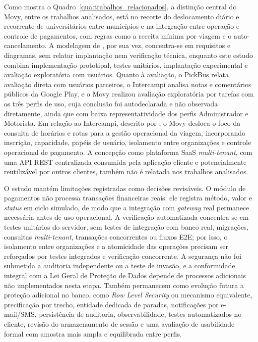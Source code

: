 \documentclass[a4paper,12pt]{article}
\begin{document}
Como mostra o Quadro~\ref{qua:trabalhos_relacionados}, a distinção central do Movy, entre os trabalhos analisados, está no recorte do deslocamento diário e recorrente de universitários entre municípios e na integração entre operação e controle de pagamentos, com regras como a receita mínima por viagem e o auto-cancelamento. A modelagem de , por sua vez, concentra-se em requisitos e diagramas, sem relatar implantação nem verificação técnica, enquanto este estudo combina implementação prototipal, testes unitários, implantação experimental e avaliação exploratória com usuários. Quanto à avaliação, o PickBus relata avaliação direta com usuários parceiros, o Intercampi analisa notas e comentários públicos da Google Play, e o Movy realizou avaliação exploratória por tarefas com os três perfis de uso, cuja conclusão foi autodeclarada e não observada diretamente, ainda que com baixa representatividade dos perfis Administrador e Motorista. Em relação ao Intercampi, descrito por , o Movy desloca o foco da consulta de horários e rotas para a gestão operacional da viagem, incorporando inscrição, capacidade, papéis de usuário, isolamento entre organizações e controle operacional de pagamento. A concepção como plataforma SaaS \textit{multi-tenant}, com uma API REST centralizada consumida pela aplicação cliente e potencialmente reutilizável por outros clientes, também não é relatada nos trabalhos analisados.

O estudo mantém limitações registradas como decisões revisáveis. O módulo de pagamentos não processa transações financeiras reais: ele registra método, valor e \textit{status} em ciclo simulado, de modo que a integração com \textit{gateway} real permanece necessária antes de uso operacional. A verificação automatizada concentra-se em testes unitários do servidor, sem testes de integração com banco real, migrações, consultas \textit{multi-tenant}, transações concorrentes ou fluxos E2E; por isso, o isolamento entre organizações e a atomicidade das operações precisam ser reforçados por testes integrados e verificação concorrente. A segurança não foi submetida a auditoria independente ou a teste de invasão, e a conformidade integral com a Lei Geral de Proteção de Dados depende de processos adicionais não implementados nesta etapa. Também permanecem como evolução futura a proteção adicional no banco, como \textit{Row Level Security} ou mecanismo equivalente, precificação por trecho, entidade dedicada de paradas, notificações por e-mail/SMS, persistência de auditoria, observabilidade, testes automatizados no cliente, revisão do armazenamento de sessão e uma avaliação de usabilidade formal com amostra mais ampla e equilibrada entre perfis.
\end{document}
